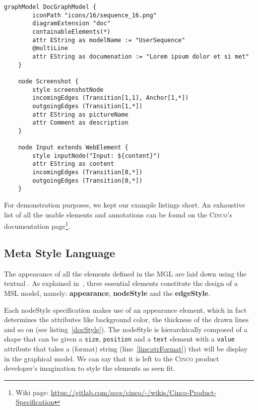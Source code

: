 \begin{lstlisting}[language=MGL, caption={Excerpt from the Doc.mgl, meta-specification of the DocGraphModel}, label=featMGL, escapechar=|]
    graphModel DocGraphModel {
        iconPath "icons/16/sequence_16.png"
        diagramExtension "doc"
        containableElements(*)
        attr EString as modelName := "UserSequence"
        @multiLine
        attr EString as documenation := "Lorem ipsum dolor et si met"
    }
    
    node Screenshot {
        style screenshotNode
        incomingEdges (Transition[1,1], Anchor[1,*])
        outgoingEdges (Transition[1,*])
        attr EString as pictureName
        attr Comment as description
    }

    node Input extends WebElement {
        style inputNode("Input: ${content}")
        attr EString as content
        incomingEdges (Transition[0,*])
        outgoingEdges (Transition[0,*])
    }
\end{lstlisting}

For demonstration purposes, we kept our example listings short. An exhaustive list of all the usable elements and annotations can be found on the \textsc{Cinco}'s documentation page\footnote[1]{Wiki page: \url{https://gitlab.com/scce/cinco/-/wikis/Cinco-Product-Specification}}.

\subsection{Meta Style Language}\label{sec:MSL}

The appearance of all the elements defined in the MGL are laid down using the textual . As explained in~\cite{gitlabcinco}, three essential elements constitute the design of a MSL model, namely: \textbf{appearance}, \textbf{nodeStyle} and the \textbf{edgeStyle}.

Each nodeStyle specification makes use of an appearance element, which in fact determines the attributes like background color, the thickness of the drawn lines and so on (see listing~\ref{docStyle}). The nodeStyle is hierarchically composed of a shape that can be given a \lstinline[language=MGL]{size}, \lstinline[language=MGL]{position} and a \lstinline[language=MGL]{text} element with a \lstinline[language=MGL]{value} attribute that takes a (format) string (line~\ref{line:strFormat}) that will be display in the graphical model. We can say that it is left to the \textsc{Cinco} product developer's imagination to style the elements as seen fit.

